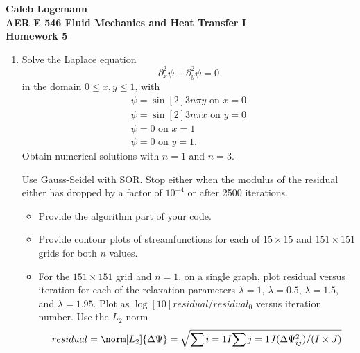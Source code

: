\documentclass[11pt, oneside]{article}
\begin{document}
\noindent \textbf{\Large{Caleb Logemann \\
AER E 546 Fluid Mechanics and Heat Transfer I \\
Homework 5
}}

%
\begin{enumerate}
  \item %
    Solve the Laplace equation
    \[
      \partial^2_x \psi + \partial^2_y \psi = 0
    \]
    in the domain $0 \le x, y \le 1$, with
    \begin{gather*}
      \psi = \sin[2]{3n\pi y} \text{ on } x = 0 \\
      \psi = \sin[2]{3n\pi x} \text{ on } y = 0 \\
      \psi = 0 \text{ on } x = 1  \\
      \psi = 0 \text{ on } y = 1.
    \end{gather*}
    Obtain numerical solutions with $n = 1$ and $n = 3$.

    Use Gauss-Seidel with SOR.
    Stop either when the modulus of the residual either has dropped by a factor
    of $10^{-4}$ or after 2500 iterations.
    \begin{itemize}
      \item Provide the algorithm part of your code.
      \item Provide contour plots of streamfunctions for each of $15 \times 15$
        and $151 \times 151$ grids for both $n$ values.
      \item For the $151 \times 151$ grid and $n = 1$, on a single graph, plot
        residual versus iteration for each of the relaxation parameters
        $\lambda = 1$, $\lambda = 0.5$, $\lambda = 1.5$, and $\lambda = 1.95$.
        Plot as $\log[10]{residual/residual_0}$ versus iteration number.
        Use the $L_2$ norm
        \[
          residual = \norm[L_2]{\Delta \Psi} = \sqrt{\sum{i = 1}{I}{\sum{j = 1}{J}{(\Delta \Psi_{ij}^2)/(I \times J)}}}
        \]
    \end{itemize}


\end{enumerate}
\end{document}
